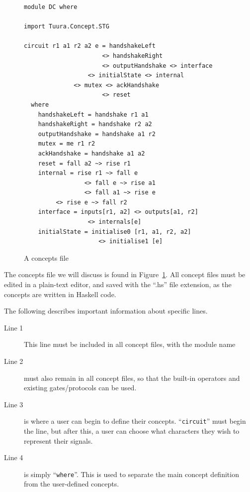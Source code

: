 \documentclass[british,conference,compsoc]{IEEEtran}
\begin{document}
\begin{figure}[h]
\begin{centering}

\begin{lstlisting}
module DC where

import Tuura.Concept.STG

circuit r1 a1 r2 a2 e = handshakeLeft 
                      <> handshakeRight 
                      <> outputHandshake <> interface 
	              <> initialState <> internal 
		      <> mutex <> ackHandshake 
                      <> reset
  where
  	handshakeLeft = handshake r1 a1
  	handshakeRight = handshake r2 a2
  	outputHandshake = handshake a1 r2
  	mutex = me r1 r2 
  	ackHandshake = handshake a1 a2
	reset = fall a2 ~> rise r1
  	internal = rise r1 ~> fall e 
                 <> fall e ~> rise a1 
                 <> fall a1 ~> rise e
		 <> rise e ~> fall r2
	interface = inputs[r1, a2] <> outputs[a1, r2] 
                  <> internals[e]
	initialState = initialise0 [r1, a1, r2, a2] 
                     <> initialise1 [e]
\end{lstlisting}

\par\end{centering}
\vspace{-2mm}
\begin{centering}
\protect\caption{\label{fig:concepts_file}A concepts file}
\vspace{-2mm}
\par\end{centering}

\end{figure}

The concepts file we will discuss is found in Figure~\ref{fig:concepts_file}.
All concept files must be edited in a plain-text editor, and saved with the 
``.hs'' file extension, as the concepts are written in Haskell code. 

The following describes important information about specific lines.

\begin{description}
  \item [Line 1]
  This line must be included in all concept files, with the module name
  
  \item [Line 2] must also remain in all concept files, so that the built-in
  operators and existing gates/protocols can be used. 
  
  \item [Line 3] is where a user can begin to define their concepts. 
  ``\texttt{circuit}'' must begin the line, but after this, a user can choose 
  what characters they wish to represent their signals.
  
  \item [Line 4] is simply ``\texttt{where}''. This is used to separate the main
  concept definition from the user-defined concepts.

\end{description}
\end{document}
